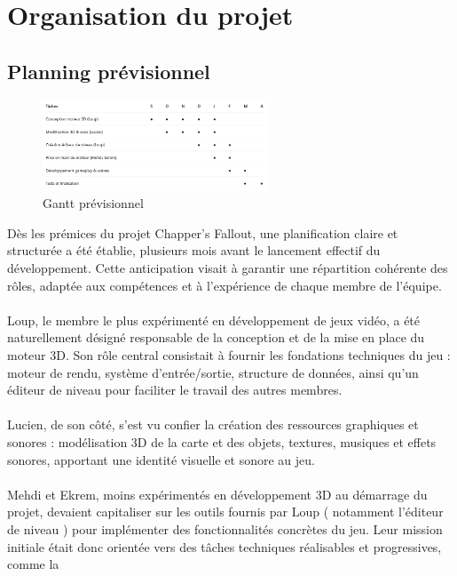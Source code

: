 \section{Organisation du projet}
    \subsection{Planning prévisionnel}

        \begin{figure}[h]
            \centering
            \includegraphics[width=0.6\textwidth]{images/gantt_previsionnel.png}
            \caption{Gantt prévisionnel}
            \label{fig:gantt_previsionnel}
        \end{figure}
        Dès les prémices du projet Chapper's Fallout, une planification claire et structurée a été établie, plusieurs mois avant le lancement effectif du développement. 
        Cette anticipation visait à garantir une répartition cohérente des rôles, adaptée aux compétences et à l'expérience de chaque membre de l'équipe.
        \\ \\
        Loup, le membre le plus expérimenté en développement de jeux vidéo, a été naturellement désigné responsable de la conception et de la mise en place du moteur 3D. 
        Son rôle central consistait à fournir les fondations techniques du jeu : moteur de rendu, système d’entrée/sortie, structure de données, ainsi qu’un éditeur de 
        niveau pour faciliter le travail des autres membres.
        \\ \\
        Lucien, de son côté, s’est vu confier la création des ressources graphiques et sonores : modélisation 3D de la carte et des objets, textures, musiques et effets 
        sonores, apportant une identité visuelle et sonore au jeu.
        \\ \\
        Mehdi et Ekrem, moins expérimentés en développement 3D au démarrage du projet, devaient capitaliser sur les outils fournis par Loup ( notamment l’éditeur de niveau  
        ) pour implémenter des fonctionnalités concrètes du jeu. Leur mission initiale était donc orientée vers des tâches techniques réalisables et progressives, comme la 
